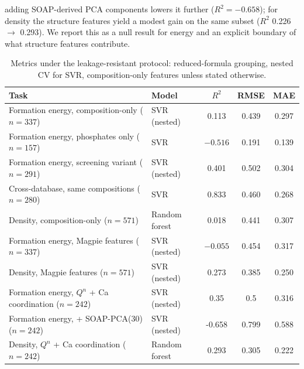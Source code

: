 \documentclass[review,11pt,a4paper]{elsarticle}
\begin{document}
adding SOAP-derived PCA components lowers it further ($R^2 = -0.658$); for density the structure features yield a modest gain on the same subset ($R^2$ 0.226 $\rightarrow$ 0.293). We report this as a null result for energy and an explicit boundary of what structure features contribute.

\begin{table}[ht]
\centering\small
\caption{Metrics under the leakage-resistant protocol: reduced-formula grouping, nested CV for SVR, composition-only features unless stated otherwise.}
\label{tab:ml}
\begin{tabular}{llccc}
\toprule
Task & Model & $R^2$ & RMSE & MAE \\
\midrule
Formation energy, composition-only ($n=337$) & SVR (nested) & 0.113 & 0.439 & 0.297 \\
Formation energy, phosphates only ($n=157$) & SVR & $-0.516$ & 0.191 & 0.139 \\
Formation energy, screening variant ($n=291$) & SVR (nested) & 0.401 & 0.502 & 0.304 \\
Cross-database, same compositions ($n=280$) & SVR & 0.833 & 0.460 & 0.268 \\
Density, composition-only ($n=571$) & Random forest & 0.018 & 0.441 & 0.307 \\
Formation energy, Magpie features ($n=337$) & SVR (nested) & $-0.055$ & 0.454 & 0.317 \\
Density, Magpie features ($n=571$) & SVR (nested) & 0.273 & 0.385 & 0.250 \\
Formation energy, $Q^n$ + Ca coordination ($n=242$) & SVR (nested) & 0.35 & 0.5 & 0.316 \\
Formation energy, + SOAP-PCA(30) ($n=242$) & SVR (nested) & -0.658 & 0.799 & 0.588 \\
Density, $Q^n$ + Ca coordination ($n=242$) & Random forest & 0.293 & 0.305 & 0.222 \\
\bottomrule
\end{tabular}
\end{table}
\end{document}
